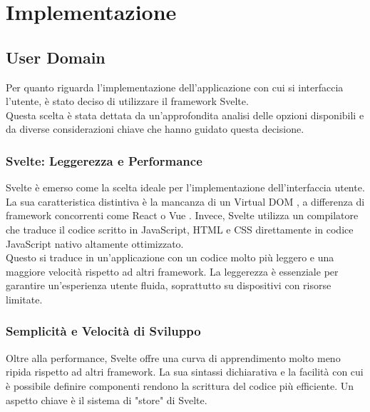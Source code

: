 

\section{Implementazione}\label{sec:implementazione}


\subsection{User Domain}

Per quanto riguarda l'implementazione dell'applicazione con cui si interfaccia l'utente,
è stato deciso di utilizzare il framework Svelte. \\

Questa scelta è stata dettata da un'approfondita analisi delle opzioni disponibili e
da diverse considerazioni chiave che hanno guidato questa decisione.

\subsubsection{Svelte: Leggerezza e Performance}

Svelte è emerso come la scelta ideale per l'implementazione dell'interfaccia utente.
La sua caratteristica distintiva è la mancanza di un Virtual DOM \cite{dom}, a differenza di
framework concorrenti come React \cite{react} o Vue \cite{vue}. Invece, Svelte utilizza un compilatore che
traduce il codice scritto in JavaScript, HTML \cite{html} e CSS \cite{css} direttamente in codice JavaScript
nativo altamente ottimizzato.\\

Questo si traduce in un'applicazione con un codice molto più
leggero e una maggiore velocità rispetto ad altri framework. La leggerezza è essenziale per
garantire un'esperienza utente fluida, soprattutto su dispositivi con risorse limitate.

\subsubsection{Semplicità e Velocità di Sviluppo}

Oltre alla performance, Svelte offre una curva di apprendimento molto meno ripida
rispetto ad altri framework. La sua sintassi dichiarativa e la facilità con cui è
possibile definire componenti rendono la scrittura del codice più efficiente.
Un aspetto chiave è il sistema di "store" di Svelte.\\

